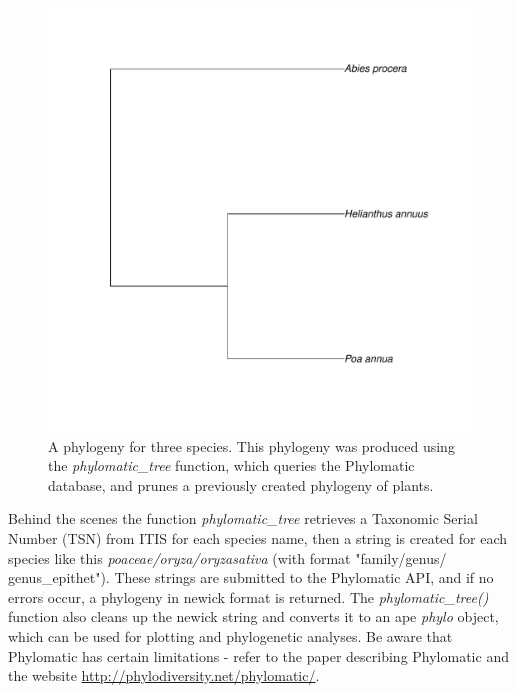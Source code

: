 \begin{sloppypar}
\begin{knitrout}
\small
{}
\color{fgcolor}
\begin{kframe}
\begin{alltt}
 \hlkwb{<-} \hlstd{(}\hlstd{,} \hlstd{,} \hlstd{)}
 \hlkwb{<-} \hlstd{(} 
\hlopt{$} \hlkwb{<-} \hlopt{$}
  \hlstd{=} \hlstd{)}
\end{alltt}
\end{kframe}
\end{knitrout}

\begin{figure}[!ht]
\begin{center}
\includegraphics[width=.7\textwidth]{chapters/taxize/phylogeny.pdf}
\end{center}
\caption[A phylogeny for three species produced using the \emph{phylomatic\_tree} function.]{
{A phylogeny for three species. This phylogeny was produced using the \emph{phylomatic\_tree} function, which queries the Phylomatic database, and prunes a previously created phylogeny of plants.}
}
\label{fig:taxize:phylomatic}
\end{figure}

Behind the scenes the function \emph{phylomatic\_tree} retrieves a Taxonomic Serial Number (TSN) from ITIS for each species name, then a string is created for each species like this \emph{poaceae/oryza/oryzasativa} (with format "family/genus/\\genus\_epithet"). 
These strings are submitted to the Phylomatic API, and if no errors occur, a phylogeny in newick format is returned. 
The \emph{phylomatic\_tree()} function also cleans up the newick string and converts it to an ape \emph{phylo} object, which can be used for plotting and phylogenetic analyses. 
Be aware that Phylomatic has certain limitations - refer to the paper describing Phylomatic \citep{webb2005} and the website \url{http://phylodiversity.net/phylomatic/}.




\end{sloppypar}
